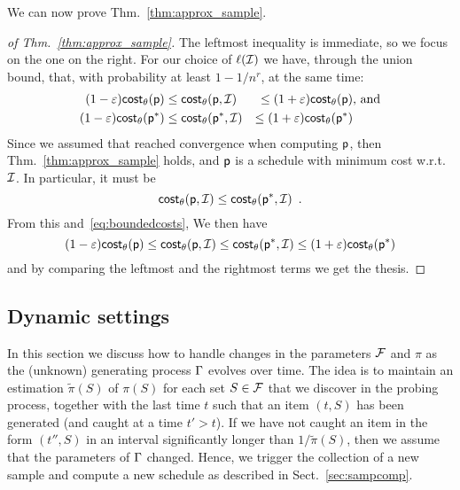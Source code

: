 We can now prove Thm.~\ref{thm:approx_sample}.
\begin{proof}[of Thm.~\ref{thm:approx_sample}]
	The leftmost inequality is immediate, so we focus on the one on the right.
	For our choice of $\ell(\mathcal{I})$ we have, through the union bound, that,
	with probability at least $1-1/n^r$, at the same time:
	\begin{align}\label{eq:boundedcosts}
		(1-\varepsilon)\mathsf{cost}_\theta(\mathsf{p})&\leq \mathsf{cost}_\theta(\mathsf{p},\mathcal{I}) &\le
		(1+\varepsilon)\mathsf{cost}_\theta(\mathsf{p}) & \mbox{, and}\nonumber\\
		(1-\varepsilon)\mathsf{cost}_\theta(\mathsf{p}^*)&\leq \mathsf{cost}_\theta(\mathsf{p}^*,\mathcal{I}) &\le
		(1+\varepsilon)\mathsf{cost}_\theta(\mathsf{p}^*)&
	\end{align}
	Since we assumed that \algonameapx reached convergence when computing
	$\mathsf{p}$, then Thm.~\ref{thm:approx_sample} holds, and $\mathsf{p}$ is a
	schedule with minimum cost w.r.t.~$\mathcal{I}$. In particular, it must be
	\[
		\mathsf{cost}_\theta(\mathsf{p},\mathcal{I})\le \mathsf{cost}_\theta(\mathsf{p}^*,\mathcal{I})\enspace.
	\]
	From this and~\eqref{eq:boundedcosts}, We then have
	\[
		(1-\varepsilon)\mathsf{cost}_\theta(\mathsf{p})\leq \mathsf{cost}_\theta(\mathsf{p},\mathcal{I}) \le
		\mathsf{cost}_\theta(\mathsf{p}^*,\mathcal{I})\le (1+\varepsilon)\mathsf{cost}_\theta(\mathsf{p}^*)
	\]
	and by comparing the leftmost and the rightmost terms we get the thesis.
\end{proof}


\subsection{Dynamic settings}\label{sec:dynamic}
In this section we discuss how to handle changes in the parameters $\mathcal{F}$ and
$\pi$ as the (unknown) generating process $\Gamma$  evolves over time.
The idea is to maintain an estimation $\tilde{\pi}(S)$ of $\pi(S)$ for each set $S\in \mathcal{F}$ that we discover in the probing process,
together with the last
time $t$ such that an item $(t,S)$ has been generated (and caught at a time
$t'>t$). If we have not caught an item in the form $(t'',S)$ in an interval
significantly longer than $1/\tilde{\pi}(S)$, then we assume that
the parameters of $\Gamma$ changed. Hence, we trigger the collection of a new
sample and compute a new schedule as described in Sect.~\ref{sec:sampcomp}.

